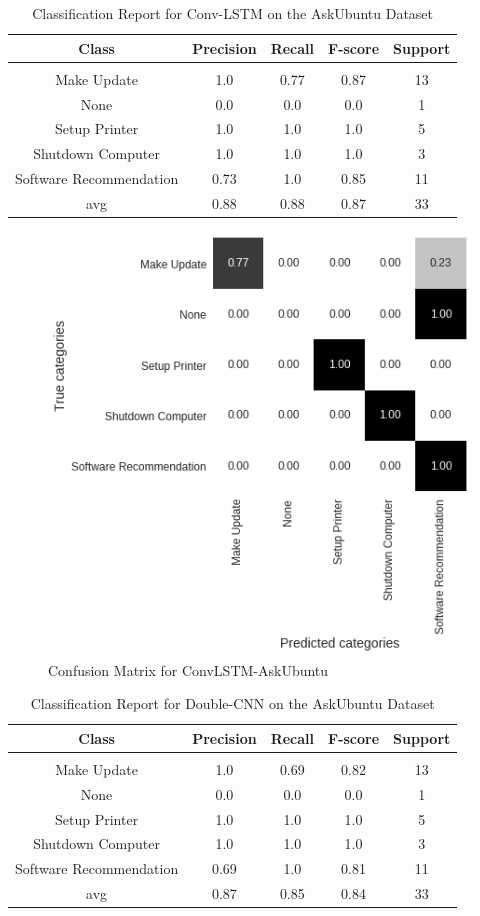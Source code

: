 \documentclass[11pt, oneside]{article}   	%
\begin{document}
\newpage
\begin{table}[h]
\centering
\caption{Classification Report for Conv-LSTM on the AskUbuntu Dataset}
\begin{tabular}{c | c c c c}
Class & Precision & Recall & F-score & Support\\
\hline
\hline\\
Make Update & 1.0 & 0.77 & 0.87 & 13\\
None & 0.0 & 0.0 & 0.0 & 1\\
Setup Printer & 1.0 & 1.0 & 1.0 & 5\\
Shutdown Computer & 1.0 & 1.0 & 1.0 & 3\\
Software Recommendation & 0.73 & 1.0 & 0.85 & 11\\
avg & 0.88 & 0.88 & 0.87 & 33\\
\end{tabular}
\end{table}

\begin{figure}[h]
\centering
\includegraphics[width=0.6\linewidth]{ConvLSTM-AskUbuntu}
\caption{Confusion Matrix for ConvLSTM-AskUbuntu}
\label{fig:ConvLSTM-AskUbuntu}
\end{figure}


\newpage
\begin{table}[h]
\centering
\caption{Classification Report for Double-CNN on the AskUbuntu Dataset}
\begin{tabular}{c | c c c c}
Class & Precision & Recall & F-score & Support\\
\hline
\hline\\
Make Update & 1.0 & 0.69 & 0.82 & 13\\
None & 0.0 & 0.0 & 0.0 & 1\\
Setup Printer & 1.0 & 1.0 & 1.0 & 5\\
Shutdown Computer & 1.0 & 1.0 & 1.0 & 3\\
Software Recommendation & 0.69 & 1.0 & 0.81 & 11\\
avg & 0.87 & 0.85 & 0.84 & 33\\
\end{tabular}
\end{table}
\end{document}
